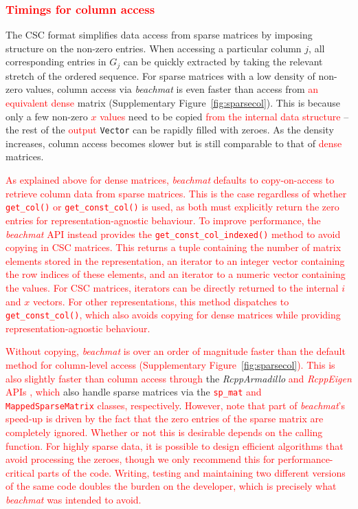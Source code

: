 \documentclass{article}
\newcommand{\beachmat}{\textit{beachmat}}
\newcommand{\code}[1]{\texttt{#1}}
\newcommand{\revised}[1]{\textcolor{red}{#1}}
\begin{document}

\subsubsection{\revised{Timings for column access}}
The CSC format simplifies data access from sparse matrices by imposing structure on the non-zero entries.
When accessing a particular column $j$, all corresponding entries in $G_j$ can be quickly extracted by taking the relevant stretch of the ordered sequence.
For sparse matrices with a low density of non-zero values, column access via \beachmat{} is even faster than access from \revised{an equivalent dense} matrix (Supplementary Figure~\ref{fig:sparsecol}).
This is because only a few non-zero \revised{$x$ values} need to be copied \revised{from the internal data structure} -- the rest of the \revised{output} \code{Vector} can be rapidly filled with zeroes.
As the density increases, column access becomes slower but is still comparable to that of \revised{dense} matrices.

\revised{As explained above for dense matrices, \beachmat{} defaults to copy-on-access to retrieve column data from sparse matrices.
This is the case regardless of whether \code{get\_col()} or \code{get\_const\_col()} is used, as both must explicitly return the zero entries for representation-agnostic behaviour.
To improve performance, the \beachmat{} API instead provides the \code{get\_const\_col\_indexed()} method to avoid copying in CSC matrices.
This returns a tuple containing the number of matrix elements stored in the representation, an iterator to an integer vector containing the row indices of these elements, and an iterator to a numeric vector containing the values.
For CSC matrices, iterators can be directly returned to the internal $i$ and $x$ vectors.
For other representations, this method dispatches to \code{get\_const\_col()}, which also avoids copying for dense matrices while providing representation-agnostic behaviour.}

\revised{Without copying, \beachmat{} is over an order of magnitude faster than the default method for column-level access (Supplementary Figure~\ref{fig:sparsecol}).
This is also slightly faster than column access through} the \textit{RcppArmadillo} \revised{and \textit{RcppEigen} APIs \cite{eddelbuettel2014arma,bates2013fast}, which} also handle sparse matrices via the \revised{\code{sp\_mat} and \code{MappedSparseMatrix} classes, respectively}.
\revised{However, note that part of \beachmat{}'s speed-up is driven by the fact that the zero entries of the sparse matrix are completely ignored.
Whether or not this is desirable depends on the calling function.
For highly sparse data, it is possible to design efficient algorithms that avoid processing the zeroes, though we only recommend this for performance-critical parts of the code.
Writing, testing and maintaining two different versions of the same code doubles the burden on the developer, which is precisely what \beachmat{} was intended to avoid.}
\end{document}

